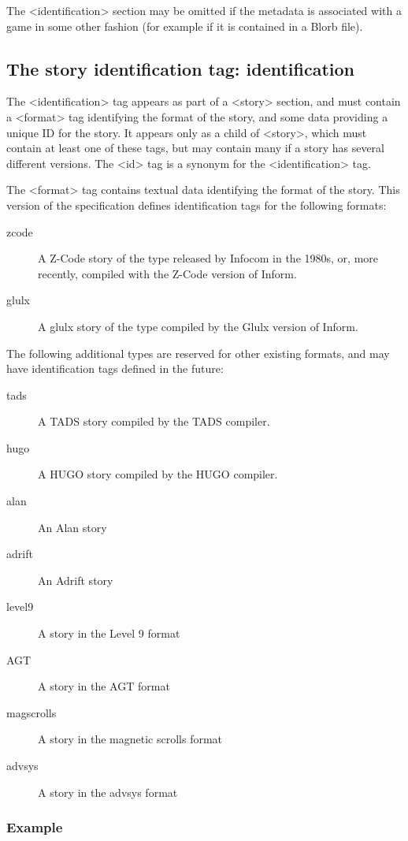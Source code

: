 \documentclass[a4paper,11pt]{article}
\begin{document}
The <identification> section may be omitted if the metadata is associated with a game in
some other fashion (for example if it is contained in a Blorb file).

\subsection{The story identification tag: identification}

The <identification> tag appears as part of a <story> section, and must contain a <format>
tag identifying the format of the story, and some data providing a unique ID for the story.
It appears only as a child of <story>, which must contain at least one of these tags, but
may contain many if a story has several different versions. The <id> tag is a synonym for
the <identification> tag.

The <format> tag contains textual data identifying the format of the story. This version
of the specification defines identification tags for the following formats:

\begin{description}
\item[zcode] A Z-Code story of the type released by Infocom in the 1980s, or, more
recently, compiled with the Z-Code version of Inform.
\item[glulx] A glulx story of the type compiled by the Glulx version of Inform.
\end{description}

The following additional types are reserved for other existing formats, and may have
identification tags defined in the future:

\begin{description}
\item[tads] A TADS story compiled by the TADS compiler.
\item[hugo] A HUGO story compiled by the HUGO compiler.
\item[alan] An Alan story
\item[adrift] An Adrift story
\item[level9] A story in the Level 9 format
\item[AGT] A story in the AGT format
\item[magscrolls] A story in the magnetic scrolls format
\item[advsys] A story in the advsys format
\end{description}

\subsubsection{Example}
\end{document}
